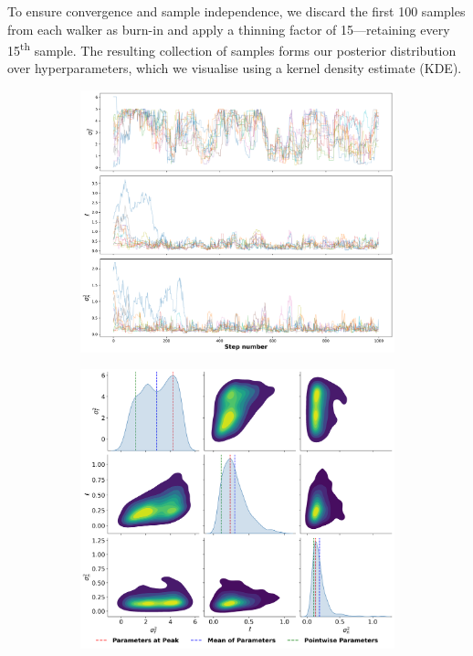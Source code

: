 \documentclass[11pt]{article}
\begin{document}
\noindent
To ensure convergence and sample independence, we discard the first 100 samples from each walker as burn-in and apply a thinning factor of 15—retaining every 15\textsuperscript{th} sample. The resulting collection of samples forms our posterior distribution over hyperparameters, which we visualise using a kernel density estimate (KDE).


\begin{figure}[H]
    \centering
    \begin{subfigure}[b]{0.48\textwidth}
        \centering
        \includegraphics[width=\textwidth]{LatexPlots/1dplots/MCMCwalkers.png}
    \end{subfigure}
    \hfill
    \begin{subfigure}[b]{0.48\textwidth}
        \centering
        \includegraphics[width=\textwidth]{LatexPlots/1dplots/MCMCdistribution.png}

\end{subfigure}
\end{figure}
\end{document}
